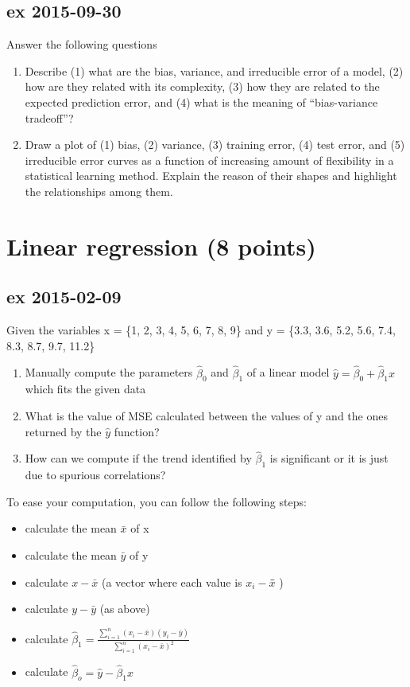 \documentclass[a4paper,12pt,titlepage]{article} %
\begin{document}
\subsection{ex 2015-09-30}
Answer the following questions
\begin{enumerate}
\item Describe (1) what are the bias, variance, and irreducible error of a model, (2) how are they related with its complexity, (3) how they are related to the expected prediction error, and (4) what is the meaning of “bias-variance tradeoff”?
\item Draw a plot of (1) bias, (2) variance, (3) training error, (4) test error, and (5) irreducible error curves as a function of increasing amount of flexibility in a statistical learning method. Explain the reason of their shapes and highlight the relationships among them.
\end{enumerate}

\section{Linear regression (8 points)}
\subsection{ex 2015-02-09}
Given the variables x = \{1, 2, 3, 4, 5, 6, 7, 8, 9\} and y = \{3.3, 3.6, 5.2, 5.6, 7.4, 8.3, 8.7, 9.7, 11.2\}
\begin{enumerate}
\item Manually compute the parameters $\hat{\beta}_{0} $ and $\hat{\beta}_{1} $ of a linear model $ \hat{y} = \hat{\beta}_{0} + \hat{\beta}_{1} x$ which fits the given data
\item What is the value of MSE calculated between the values of y and the ones returned by the $\hat{y}$ function?
\item How can we compute if the trend identified by $\hat{\beta}_{1}$ is significant or it is just due to spurious correlations?
\end{enumerate}
 
To ease your computation, you can follow the following steps:
\begin{itemize}
\item calculate the mean $\bar{x}$ of x
\item calculate the mean $\bar{y}$ of y
\item calculate $ x - \bar{x} $ (a vector where each value is $ x_{i} - \bar{x} $̄ )
\item calculate $ y - \bar{y} $ (as above)
\item calculate $ \hat{\beta}_{1} = \frac{\sum_{i=1}^{n} (x_{i}-\bar{x}) (y_{i}-\bar{y})}{ \sum_{i=1}^{n} (x_{i}-\bar{x})^{2} } $
\item calculate $ \hat{\beta}_{o} = \hat{y} - \hat{\beta}_{1} x $
\end{itemize}
\end{document}
